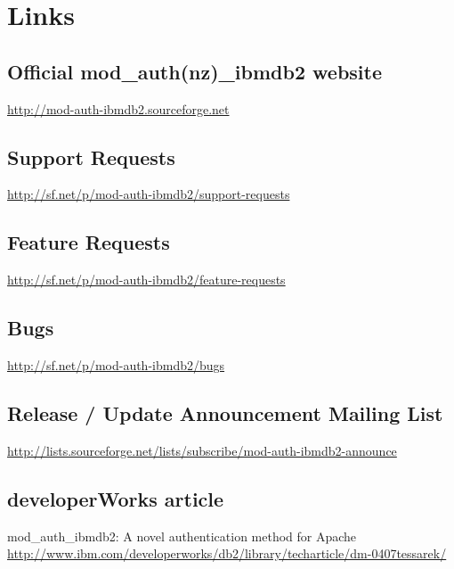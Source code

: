 \section{Links}
\subsection{Official mod\_auth(nz)\_ibmdb2 website}
\url{http://mod-auth-ibmdb2.sourceforge.net}
\subsection{Support Requests}
\url{http://sf.net/p/mod-auth-ibmdb2/support-requests}
\subsection{Feature Requests}
\url{http://sf.net/p/mod-auth-ibmdb2/feature-requests}
\subsection{Bugs}
\url{http://sf.net/p/mod-auth-ibmdb2/bugs}
\subsection{Release / Update Announcement Mailing List}
\url{http://lists.sourceforge.net/lists/subscribe/mod-auth-ibmdb2-announce}
\subsection{developerWorks article}
mod\_auth\_ibmdb2: A novel authentication method for Apache\\
\url{http://www.ibm.com/developerworks/db2/library/techarticle/dm-0407tessarek/}
